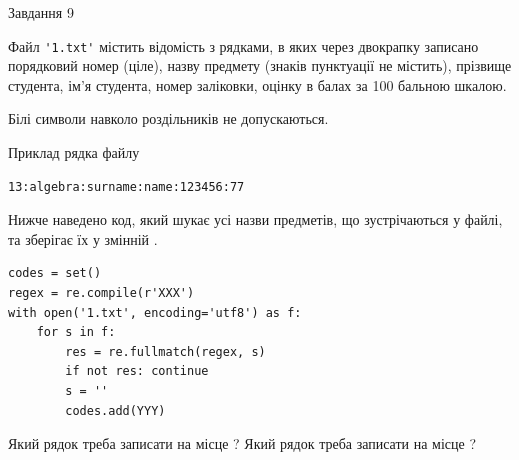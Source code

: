 \documentclass[12pt, ukrainian]{article}
\def\code#1{\Verb!#1!}
\begin{document}
{\begin{minipage}[t]{8.0cm}
\end{minipage}

               
{\begin{center}Завдання {9}\end{center}}
\vspace{-6mm}
Файл \code{'1.txt'} містить відомість з рядками, в яких через двокрапку записано поряд\-ковий номер (ціле), назву предмету (знаків пунктуації не містить), прізвище студента, ім'я студента, номер заліковки, оцінку в балах за 100 бальною шкалою.

Білі символи навколо роздільників не допускаються.

Приклад рядка файлу



\begin{verbatim}
13:algebra:surname:name:123456:77
\end{verbatim}


Нижче наведено код, який шукає усі назви предметів, що зустрічаються у файлі, та зберігає їх у змінній .



\begin{verbatim}
codes = set()
regex = re.compile(r'XXX')
with open('1.txt', encoding='utf8') as f:
    for s in f:
        res = re.fullmatch(regex, s)
        if not res: continue
        s = ''
        codes.add(YYY)
\end{verbatim}



Який рядок треба записати на місце  ?
Який рядок треба записати на місце  ?\par

}
\newpage
\end{document}
